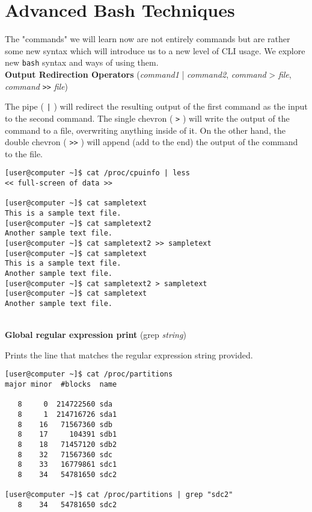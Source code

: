 \documentclass[11pt,oneside]{article}
\newenvironment{articleSectionN}[1]
{#1}
{}
\begin{document}
\section{Advanced Bash Techniques}
\begin{articleSectionN}
\noindent The "commands" we will learn now are not entirely commands but are rather some new syntax which will introduce us to a new level of CLI usage. We explore new \lstinline{bash} syntax and ways of using them.\\

\noindent\textbf{Output Redirection Operators} (\emph{command1} | \emph{command2}, \emph{command} > \emph{file}, \emph{command} \lstinline{>>} \emph{file})

The pipe ( \lstinline{|} ) will redirect the resulting output of the first command as the input to the second command. The single chevron ( \lstinline{>} ) will write the output of the command to a file, overwriting anything inside of it. On the other hand, the double chevron ( \lstinline{>>} ) will append (add to the end) the output of the command to the file.

\begin{lstlisting}
[user@computer ~]$ cat /proc/cpuinfo | less
<< full-screen of data >>

[user@computer ~]$ cat sampletext
This is a sample text file.
[user@computer ~]$ cat sampletext2
Another sample text file.
[user@computer ~]$ cat sampletext2 >> sampletext
[user@computer ~]$ cat sampletext
This is a sample text file.
Another sample text file.
[user@computer ~]$ cat sampletext2 > sampletext
[user@computer ~]$ cat sampletext
Another sample text file.
\end{lstlisting}

\newpage

\quad \\
\noindent\textbf{Global regular expression print} (grep \emph{string})

Prints the line that matches the regular expression string provided.

\begin{lstlisting}
[user@computer ~]$ cat /proc/partitions
major minor  #blocks  name

   8     0  214722560 sda
   8     1  214716726 sda1
   8    16   71567360 sdb
   8    17     104391 sdb1
   8    18   71457120 sdb2
   8    32   71567360 sdc
   8    33   16779861 sdc1
   8    34   54781650 sdc2

[user@computer ~]$ cat /proc/partitions | grep "sdc2"
   8    34   54781650 sdc2
\end{lstlisting}


\end{articleSectionN}
\end{document}
